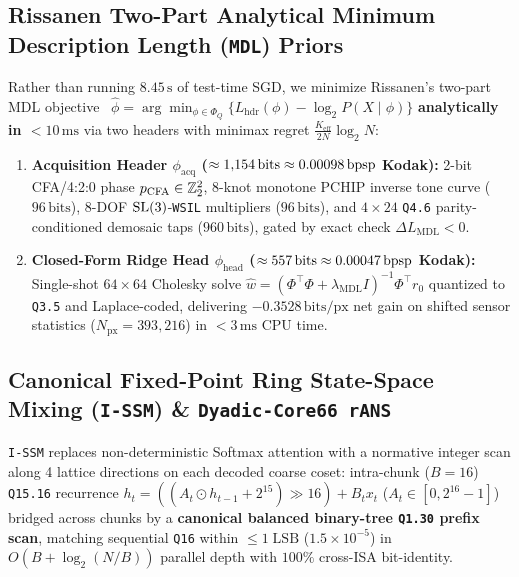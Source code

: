 \subsection{Rissanen Two-Part Analytical Minimum Description Length (\texttt{MDL}) Priors}
Rather than running $8.45\,\mathrm{s}$ of test-time SGD, we minimize Rissanen's two-part MDL objective~\citep{rissanen1984} $\hat{\phi} = \arg\min_{\phi \in \Phi_Q}\{L_{\mathrm{hdr}}(\phi) - \log_2 P(X\mid \phi)\}$ \textbf{analytically in $<10\,\mathrm{ms}$} via two headers with minimax regret $\frac{K_{\mathrm{eff}}}{2N}\log_2 N$:
\begin{enumerate}
  \item \textbf{Acquisition Header $\phi_{\mathrm{acq}}$ ($\approx 1{,}154\,\mathrm{bits} \approx 0.00098\,\mathrm{bpsp}$ Kodak):} 2-bit CFA/4:2:0 phase $p_{\mathrm{CFA}} \in \mathbb{Z}_2^2$, 8-knot monotone PCHIP inverse tone curve ($96\,\mathrm{bits}$), 8-DOF $\mathrm{SL}(3)$-\texttt{WSIL} multipliers ($96\,\mathrm{bits}$), and $4\times 24$ \texttt{Q4.6} parity-conditioned demosaic taps ($960\,\mathrm{bits}$), gated by exact check $\Delta L_{\mathrm{MDL}} < 0$.
  \item \textbf{Closed-Form Ridge Head $\phi_{\mathrm{head}}$ ($\approx 557\,\mathrm{bits} \approx 0.00047\,\mathrm{bpsp}$ Kodak):} Single-shot $64\times 64$ Cholesky solve $\hat{w} = (\Phi^\top\Phi + \lambda_{\mathrm{MDL}}I)^{-1}\Phi^\top r_0$ quantized to \texttt{Q3.5} and Laplace-coded, delivering \textbf{$-0.3528\,\mathrm{bits/px}$} net gain on shifted sensor statistics ($N_{\mathrm{px}}=393{,}216$) in $<3\,\mathrm{ms}$ CPU time.
\end{enumerate}

\subsection{Canonical Fixed-Point Ring State-Space Mixing (\texttt{I-SSM}) \& \texttt{Dyadic-Core66 rANS}}
\texttt{I-SSM} replaces non-deterministic Softmax attention with a normative integer scan along 4 lattice directions on each decoded coarse coset: intra-chunk ($B=16$) \texttt{Q15.16} recurrence $h_t = ((A_t \odot h_{t-1} + 2^{15})\gg 16) + B_t x_t$ ($A_t \in [0, 2^{16}-1]$) bridged across chunks by a \textbf{canonical balanced binary-tree \texttt{Q1.30} prefix scan}, matching sequential \texttt{Q16} within $\le 1\;\mathrm{LSB}$ ($1.5\times 10^{-5}$) in $O(B + \log_2(N/B))$ parallel depth with $100\%$ cross-ISA bit-identity.

